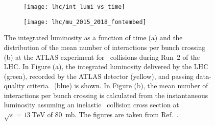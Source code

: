 
\begin{figure}[htbp]
  \centering

  \begin{subfigure}{0.47\textwidth}
    \texttt{[image: lhc/int\_lumi\_vs\_time]}
    \subcaption{}%
    \label{fig:atlas_int_lumi_vs_time}
  \end{subfigure}\hspace*{0.02\textwidth}%
  \begin{subfigure}{0.47\textwidth}
    \texttt{[image: lhc/mu\_2015\_2018\_fontembed]}
    \subcaption{}%
    \label{fig:atlas_mu}
  \end{subfigure}

  \caption[Integrated luminosity and mean number of interactions per bunch
  crossing at the ATLAS experiment during Run~2 of the LHC.]{The integrated
    luminosity as a function of time (a) and the distribution of the mean number
    of interactions per bunch crossing (b) at the ATLAS experiment for
    \pp~collisions during Run~2 of the LHC. In Figure (a), the integrated
    luminosity delivered by the LHC (green), recorded by the ATLAS detector
    (yellow), and passing data-quality criteria~\cite{DAPR-2018-01} (blue) is
    shown. In Figure (b), the mean number of interactions per bunch crossing is
    calculated from the instantaneous luminosity assuming an inelastic
    \pp~collision cross section at $\sqrt{s} = \SI{13}{\TeV}$ of
    \SI{80}{\milli\barn}. The figures are taken from
    Ref.~\cite{atlas_luminosity_summary_plots}.}%
  \label{fig:lumi_and_pu}
\end{figure}

